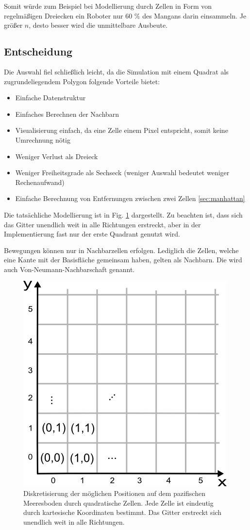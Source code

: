 \documentclass{article}
\begin{document}
Somit würde zum Beispiel bei Modellierung durch Zellen in Form von regelmäßigen Dreiecken ein Roboter
nur 60 \% des Mangans darin einsammeln. Je größer $n$, desto besser wird die unmittelbare Ausbeute.

\subsection{Entscheidung}

Die Auswahl fiel schließlich leicht, da die Simulation mit einem Quadrat als 
zugrundeliegendem Polygon folgende Vorteile bietet:

\begin{itemize}
\item Einfache Datenstruktur
\item Einfaches Berechnen der Nachbarn
\item Visualisierung einfach, da eine Zelle einem Pixel entspricht, somit keine Umrechnung nötig
\item Weniger Verlust als Dreieck
\item Weniger Freiheitsgrade als Sechseck (weniger Auswahl bedeutet weniger Rechenaufwand)
\item Einfache Berechnung von Entfernungen zwischen zwei Zellen \ref{sec:manhattan}
\end{itemize}

Die tatsächliche Modellierung ist in Fig. \ref{img:ocean_floor_squared} dargestellt. Zu beachten ist,
dass sich das Gitter unendlich weit in alle Richtungen erstreckt, aber in der Implementierung
fast nur der erste Quadrant genutzt wird. 

Bewegungen können nur in Nachbarzellen erfolgen. Lediglich die Zellen, welche eine Kante mit der 
Basisfläche gemeinsam haben, gelten als Nachbarn. Die wird auch Von-Neumann-Nachbarschaft genannt.

\begin{figure}[hbt]
\centering
\includegraphics[width=.5\textwidth]{img/ocean_floor.png}
\caption{Diskretisierung der möglichen Positionen auf dem pazifischen Meeresboden durch quadratische Zellen. Jede Zelle
ist eindeutig durch kartesische Koordinaten bestimmt. Das Gitter erstreckt sich unendlich weit in alle Richtungen. }
\label{img:ocean_floor_squared}
\end{figure} 
\end{document}
